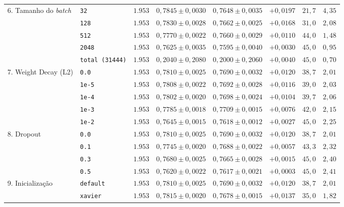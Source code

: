 \documentclass[12pt,a4paper]{article}
\begin{document}
\begin{table}[H]
{\begin{tabular}{llcccccc}
\midrule
\multirow{5}{*}{6. Tamanho do \textit{batch}} 
 & \texttt{32} & $1.953$ & $0{,}7845 \pm 0{,}0030$ & $0{,}7648 \pm 0{,}0035$ & $+0{,}0197$ & $21{,}7$ & $4{,}35$ \\
 & \texttt{128} & $1.953$ & $0{,}7830 \pm 0{,}0028$ & $0{,}7662 \pm 0{,}0025$ & $+0{,}0168$ & $31{,}0$ & $2{,}08$ \\
 & \texttt{512} & $1.953$ & $0{,}7770 \pm 0{,}0022$ & $0{,}7660 \pm 0{,}0029$ & $+0{,}0110$ & $44{,}0$ & $1{,}48$ \\
 & \texttt{2048} & $1.953$ & $0{,}7625 \pm 0{,}0035$ & $0{,}7595 \pm 0{,}0040$ & $+0{,}0030$ & $45{,}0$ & $0{,}95$ \\
 & \texttt{total (31444)} & $1.953$ & $0{,}2040 \pm 0{,}2080$ & $0{,}2000 \pm 0{,}2060$ & $+0{,}0040$ & $45{,}0$ & $0{,}70$ \\
\midrule
\multirow{5}{*}{7. Weight Decay (L2)} 
 & \texttt{0.0} & $1.953$ & $0{,}7810 \pm 0{,}0025$ & $0{,}7690 \pm 0{,}0032$ & $+0{,}0120$ & $38{,}7$ & $2{,}01$ \\
 & \texttt{1e-5} & $1.953$ & $0{,}7808 \pm 0{,}0022$ & $0{,}7692 \pm 0{,}0028$ & $+0{,}0116$ & $39{,}0$ & $2{,}03$ \\
 & \texttt{1e-4} & $1.953$ & $0{,}7802 \pm 0{,}0020$ & $0{,}7698 \pm 0{,}0024$ & $+0{,}0104$ & $39{,}7$ & $2{,}06$ \\
 & \texttt{1e-3} & $1.953$ & $0{,}7785 \pm 0{,}0018$ & $0{,}7709 \pm 0{,}0015$ & $+0{,}0076$ & $42{,}0$ & $2{,}15$ \\
 & \texttt{1e-2} & $1.953$ & $0{,}7645 \pm 0{,}0015$ & $0{,}7618 \pm 0{,}0012$ & $+0{,}0027$ & $45{,}0$ & $2{,}25$ \\
\midrule
\multirow{4}{*}{8. Dropout} 
 & \texttt{0.0} & $1.953$ & $0{,}7810 \pm 0{,}0025$ & $0{,}7690 \pm 0{,}0032$ & $+0{,}0120$ & $38{,}7$ & $2{,}01$ \\
 & \texttt{0.1} & $1.953$ & $0{,}7745 \pm 0{,}0020$ & $0{,}7688 \pm 0{,}0022$ & $+0{,}0057$ & $43{,}3$ & $2{,}32$ \\
 & \texttt{0.3} & $1.953$ & $0{,}7680 \pm 0{,}0025$ & $0{,}7665 \pm 0{,}0028$ & $+0{,}0015$ & $45{,}0$ & $2{,}40$ \\
 & \texttt{0.5} & $1.953$ & $0{,}7620 \pm 0{,}0022$ & $0{,}7617 \pm 0{,}0021$ & $+0{,}0003$ & $45{,}0$ & $2{,}41$ \\
\midrule
\multirow{4}{*}{9. Inicialização} 
 & \texttt{default} & $1.953$ & $0{,}7810 \pm 0{,}0025$ & $0{,}7690 \pm 0{,}0032$ & $+0{,}0120$ & $38{,}7$ & $2{,}01$ \\
 & \texttt{xavier} & $1.953$ & $0{,}7815 \pm 0{,}0020$ & $0{,}7678 \pm 0{,}0015$ & $+0{,}0137$ & $35{,}0$ & $1{,}82$ \\

\end{tabular}}
\end{table}
\end{document}
